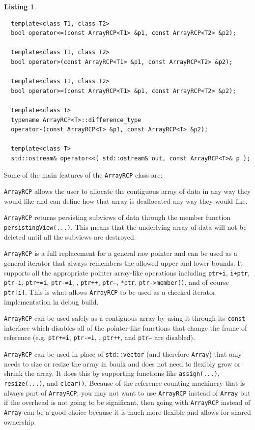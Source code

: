 \documentclass[pdf,ps2pdf,11pt]{SANDreport}
\newtheorem{listing}{Listing}
\begin{document}
\begin{listing}
{\begin{verbatim}
  template<class T1, class T2>
  bool operator<=(const ArrayRCP<T1> &p1, const ArrayRCP<T2> &p2);
  
  template<class T1, class T2>
  bool operator>(const ArrayRCP<T1> &p1, const ArrayRCP<T2> &p2);
  
  template<class T1, class T2>
  bool operator>=(const ArrayRCP<T1> &p1, const ArrayRCP<T2> &p2);
  
  template<class T>
  typename ArrayRCP<T>::difference_type
  operator-(const ArrayRCP<T> &p1, const ArrayRCP<T> &p2);
  
  template<class T>
  std::ostream& operator<<( std::ostream& out, const ArrayRCP<T>& p );
\end{verbatim}}
\end{listing}

Some of the main features of the {}\texttt{ArrayRCP} class are:

{}\texttt{ArrayRCP} allows the user to allocate the contiguous array
of data in any way they would like and can define how that array is
deallocated any way they would like.

{}\texttt{ArrayRCP} returns persisting subviews of data through the
member function {}\texttt{persistingView(...)}.  This means that the
underlying array of data will not be deleted until all the subviews
are destroyed.

{}\texttt{ArrayRCP} is a full replacement for a general raw
pointer and can be used as a general iterator that always remembers
the allowed upper and lower bounds.  It supports all the appropriate
pointer array-like operations including {}\texttt{ptr+i},
{}\texttt{i+ptr}, {}\texttt{ptr-i}, {}\texttt{ptr+=i},
{}\texttt{ptr-=i}, , {}\texttt{ptr++}, {}\texttt{ptr--},
{}\texttt{*ptr}, {}\texttt{ptr->member()}, and of course
{}\texttt{ptr[i]}.  This is what allows {}\texttt{ArrayRCP} to be used
as a checked iterator implementation in debug build.

{}\texttt{ArrayRCP} can be used safely as a contiguous array by
using it through its {}\texttt{const} interface which disables all of
the pointer-like functions that change the frame of reference
(e.g. {}\texttt{ptr+=i}, {}\texttt{ptr-=i}, , {}\texttt{ptr++}, and
{}\texttt{ptr--} are disabled).

{}\texttt{ArrayRCP} can be used in place of
{}\texttt{std::vector} (and therefore {}\texttt{Array}) that only
needs to size or resize the array in baulk and does not need to
flexibly grow or shrink the array.  It does this by supporting
functions like {}\texttt{assign(...)}, {}\texttt{resize(...)}, and
{}\texttt{clear()}.  Because of the reference counting machinery that
is always part of {}\texttt{ArrayRCP}, you may not want to use
{}\texttt{ArrayRCP} instead of {}\texttt{Array} but if the overhead is
not going to be significant, then going with {}\texttt{ArrayRCP}
instead of {}\texttt{Array} can be a good choice because it is much
more flexible and allows for shared ownership.
\end{document}
